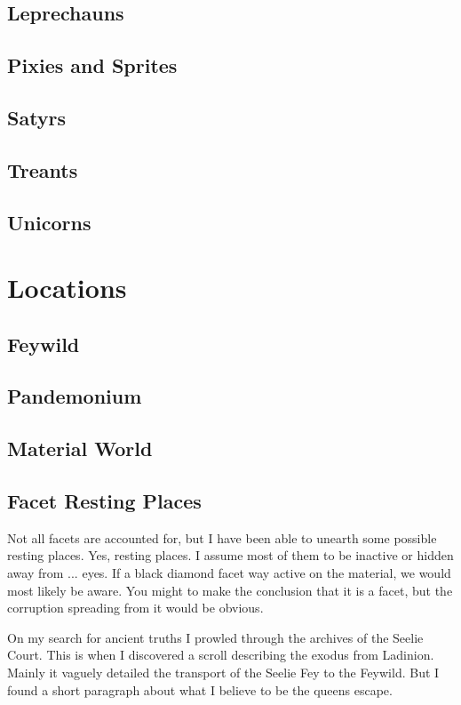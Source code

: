 \documentclass[letter,10pt,twocolumn,openany]{dndbook}
\begin{document}
\section{Leprechauns}

\section{Pixies and Sprites}

\section{Satyrs}

\section{Treants}

\section{Unicorns}


\chapter{Locations}

\section{Feywild}
\section{Pandemonium}
\section{Material World}

\section{Facet Resting Places}

Not all facets are accounted for, but I have been able to unearth some possible resting places.
Yes, resting places. I assume most of them to be inactive or hidden away from ... eyes.
If a black diamond facet way active on the material, we would most likely be aware.
You might to make the conclusion that it is a facet, but the corruption spreading from it would be obvious.

On my search for ancient truths I prowled through the archives of the Seelie Court.
This is when I discovered a scroll describing the exodus from Ladinion.
Mainly it vaguely detailed the transport of the Seelie Fey to the Feywild.
But I found a short paragraph about what I believe to be the queens escape.
\end{document}
